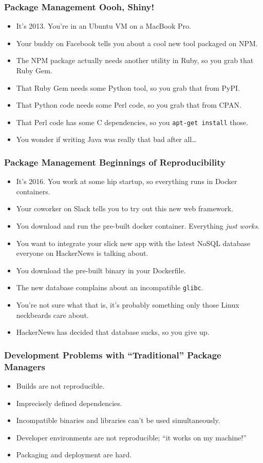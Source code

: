 \documentclass{beamer}
\begin{document}
\begin{frame}
\frametitle{Package Management \textemdash Oooh, Shiny!}
\begin{itemize}
\item It's 2013. You're in an Ubuntu VM on a MacBook Pro.
\item Your buddy on Facebook tells you about a cool new tool packaged on NPM.
\item The NPM package actually needs another utility in Ruby, so you grab that Ruby Gem.
\item That Ruby Gem needs some Python tool, so you grab that from PyPI.
\item That Python code needs some Perl code, so you grab that from CPAN.
\item That Perl code has some C dependencies, so you \texttt{apt-get install} those.
\item You wonder if writing Java was really that bad after all\ldots
\end{itemize}
\end{frame}

\begin{frame}
\frametitle{Package Management \textemdash Beginnings of Reproducibility}
\begin{itemize}
\item It's 2016. You work at some hip startup, so everything runs in Docker containers.
\item Your coworker on Slack tells you to try out this new web framework.
\item You download and run the pre-built docker container. Everything \emph{just works}.
\item You want to integrate your slick new app with the latest NoSQL database everyone on HackerNews is talking about.
\item You download the pre-built binary in your Dockerfile.
\item The new database complains about an incompatible \texttt{glibc}.
\item You're not sure what that is, it's probably something only those Linux neckbeards care about.
\item HackerNews has decided that database sucks, so you give up.
\end{itemize}
\end{frame}

\begin{frame}
\frametitle{Development Problems with ``Traditional'' Package Managers}
\begin{itemize}
\item Builds are not reproducible.
\item Imprecisely defined dependencies.
\item Incompatible binaries and libraries can't be used simultaneously.
\item Developer environments are not reproducible; ``it works on my machine!''
\item Packaging and deployment are hard.
\end{itemize}
\end{frame}
\end{document}
